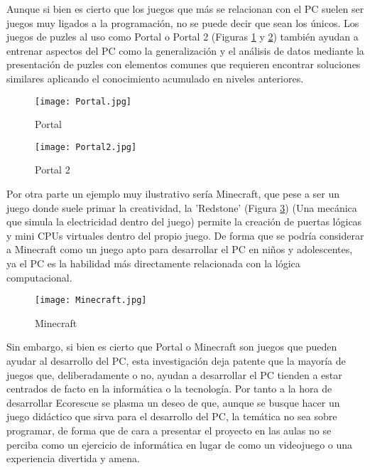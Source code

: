 Aunque si bien es cierto que los juegos que más se relacionan con el PC suelen ser juegos muy ligados a la programación, no se puede decir que sean los únicos. Los juegos de puzles al uso como Portal\cite{portal} o Portal 2\cite{portal2} (Figuras \ref{fig:portal} y \ref{fig:portal2}) también ayudan a entrenar aspectos del PC como la generalización y el análisis de datos mediante la presentación de puzles con elementos comunes que requieren encontrar soluciones similares aplicando el conocimiento acumulado en niveles anteriores.

\begin{figure}[H]
    \centering
      \texttt{[image: Portal.jpg]}
    \caption{Portal}
    \label{fig:portal}
\end{figure}

\begin{figure}[H]
    \centering
      \texttt{[image: Portal2.jpg]}
    \caption{Portal 2}
    \label{fig:portal2}
\end{figure}

Por otra parte un ejemplo muy ilustrativo sería Minecraft\cite{Minecraft}, que pese a ser un juego donde suele primar la creatividad, la 'Redstone' (Figura \ref{fig:minecraft}) (Una mecánica que simula la electricidad dentro del juego) permite la creación de puertas lógicas y mini CPUs virtuales dentro del propio juego. De forma que se podría considerar a Minecraft como un juego apto para desarrollar el PC en niños y adolescentes, ya el PC es la habilidad más directamente relacionada con la lógica computacional.

\begin{figure}[H]
    \centering
      \texttt{[image: Minecraft.jpg]}
    \caption{Minecraft}
    \label{fig:minecraft}
\end{figure}


Sin embargo, si bien es cierto que Portal o Minecraft son juegos que pueden ayudar al desarrollo del PC, esta investigación deja patente que la mayoría de juegos que, deliberadamente o no, ayudan a desarrollar el PC tienden a estar centrados de facto en la informática o la tecnología. Por tanto a la hora de desarrollar Ecorescue se plasma un deseo de que, aunque se busque hacer un juego didáctico que sirva para el desarrollo del PC, la temática no sea sobre programar, de forma que de cara a presentar el proyecto en las aulas no se perciba como un ejercicio de informática en lugar de como un videojuego o una experiencia divertida y amena.